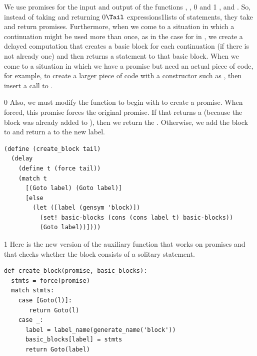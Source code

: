 \documentclass[7x10]{TimesAPriori_MIT}%
\def\racketEd{0}
\def\pythonEd{1}
\def\edition{1}
\newcommand{\racket}[1]{{\if\edition\racketEd{#1}\fi}}
\newcommand{\pythonColor}[0]{}
\newcommand{\python}[1]{{\if\edition\pythonEd\pythonColor #1\fi}}
\numberwithin{theorem}{chapter}
\numberwithin{definition}{chapter}
\numberwithin{equation}{chapter}
\begin{document}
We use promises for the input and output of the functions
, ,
%
\racket{ and }\python{ , and }.
%
So, instead of taking and returning \racket{$\Tail$
  expressions}\python{lists of statements}, they take and return
promises. Furthermore, when we come to a situation in which a
continuation might be used more than once, as in the case for
 in , we create a delayed computation
that creates a basic block for each continuation (if there is not
already one) and then returns a  statement to that basic
block. When we come to a situation in which we have a promise but need an
actual piece of code, for example, to create a larger piece of code with a
constructor such as , then insert a call to .
%
{\if\edition\racketEd
%
Also, we must modify the  function to begin with
 to create a promise. When forced, this promise forces the
original promise. If that returns a  (because the block was
already added to ), then we return the
. Otherwise, we add the block to  and
return a  to the new label.
\begin{center}
\begin{minipage}{\textwidth}
\begin{lstlisting}
(define (create_block tail)
  (delay
    (define t (force tail))
    (match t
      [(Goto label) (Goto label)]
      [else
        (let ([label (gensym 'block)])
          (set! basic-blocks (cons (cons label t) basic-blocks))
          (Goto label))])))
\end{lstlisting}
\end{minipage}
\end{center}
\fi}

{\if\edition\pythonEd\pythonColor
%
Here is the new version of the  auxiliary function
that works on promises and that checks whether the block consists of a
solitary  statement.\\
\begin{minipage}{\textwidth}
\begin{lstlisting}
def create_block(promise, basic_blocks):
  stmts = force(promise)
  match stmts:
    case [Goto(l)]:
       return Goto(l)
    case _:
      label = label_name(generate_name('block'))
      basic_blocks[label] = stmts
      return Goto(label)
\end{lstlisting}
\end{minipage}

\fi}
\end{document}
